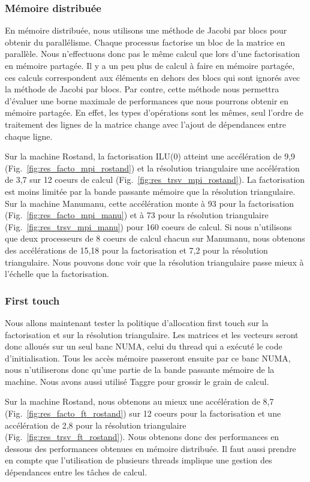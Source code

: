 \subsubsection{Mémoire distribuée}
En mémoire distribuée, nous utilisons une méthode de Jacobi par blocs pour obtenir du parallélisme.
%
Chaque processus factorise un bloc de la matrice en parallèle.
%
Nous n'effectuons donc pas le même calcul que lors d'une factorisation en mémoire partagée.
%
Il y a un peu plus de calcul à faire en mémoire partagée, ces calculs correspondent aux éléments en dehors des blocs qui sont ignorés avec la méthode de Jacobi par blocs.
%
Par contre, cette méthode nous permettra d'évaluer une borne maximale de performances que nous pourrons obtenir en mémoire partagée.
%
En effet, les types d'opérations sont les mêmes, seul l'ordre de traitement des lignes de la matrice change avec l'ajout de dépendances entre chaque ligne.


Sur la machine Rostand, la factorisation ILU(0) atteint une accélération de 9,9 (Fig.~\ref{fig:res_facto_mpi_rostand}) et la résolution triangulaire une accélération de 3,7 sur 12 coeurs de calcul (Fig.~\ref{fig:res_trsv_mpi_rostand}).
%
La factorisation est moins limitée par la bande passante mémoire que la résolution triangulaire.
%
Sur la machine Manumanu, cette accélération monte à 93 pour la factorisation (Fig.~\ref{fig:res_facto_mpi_manu}) et à 73 pour la résolution triangulaire (Fig.~\ref{fig:res_trsv_mpi_manu}) pour 160 coeurs de calcul.
%
Si nous n'utilisons que deux processeurs de 8 coeurs de calcul chacun sur Manumanu, nous obtenons des accélérations de 15,18 pour la factorisation et 7,2 pour la résolution triangulaire.
%
Nous pouvons donc voir que la résolution triangulaire passe mieux à l'échelle que la factorisation.


\subsubsection{First touch}
Nous allons maintenant tester la politique d'allocation first touch sur la factorisation et sur la résolution triangulaire.
%
Les matrices et les vecteurs seront donc alloués sur un seul banc NUMA, celui du thread qui a exécuté le code d'initialisation.
%
Tous les accès mémoire passeront ensuite par ce banc NUMA, nous n'utiliserons donc qu'une partie de la bande passante mémoire de la machine.
%
Nous avons aussi utilisé Taggre pour grossir le grain de calcul.


Sur la machine Rostand, nous obtenons au mieux une accélération de 8,7 (Fig.~\ref{fig:res_facto_ft_rostand}) sur 12 coeurs pour la factorisation et une accélération de 2,8 pour la résolution triangulaire (Fig.~\ref{fig:res_trsv_ft_rostand}).
%
Nous obtenons donc des performances en dessous des performances obtenues en mémoire distribuée.
%
Il faut aussi prendre en compte que l'utilisation de plusieurs threads implique une gestion des dépendances entre les tâches de calcul.


